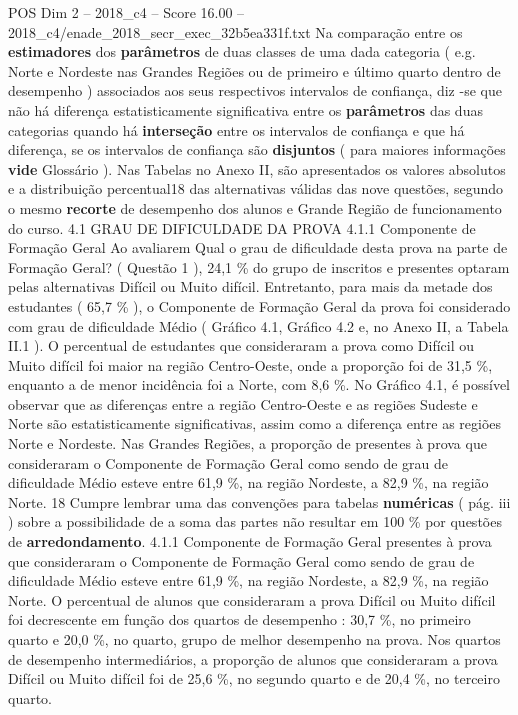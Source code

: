 \begin{textsample}{POS Dim 2 – 2018\_c4 – Score 16.00 – 2018\_c4/enade\_2018\_secr\_exec\_32b5ea331f.txt}
Na comparação entre os \textbf{estimadores} dos \textbf{parâmetros} de duas classes de uma dada categoria ( e.g.
Norte e Nordeste nas Grandes Regiões ou de primeiro e último quarto dentro de desempenho ) associados aos seus respectivos intervalos de confiança, diz -se que não há diferença estatisticamente significativa entre os \textbf{parâmetros} das duas categorias quando há \textbf{interseção} entre os intervalos de confiança e que há diferença, se os intervalos de confiança são \textbf{disjuntos} ( para maiores informações \textbf{vide} Glossário ).
Nas Tabelas no Anexo II, são apresentados os valores absolutos e a distribuição percentual18 das alternativas válidas das nove questões, segundo o mesmo \textbf{recorte} de desempenho dos alunos e Grande Região de funcionamento do curso. 4.1 GRAU DE DIFICULDADE DA PROVA 4.1.1 Componente de Formação Geral Ao avaliarem Qual o grau de dificuldade desta prova na parte de Formação Geral? ( Questão 1 ), 24,1 \% do grupo de inscritos e presentes optaram pelas alternativas Difícil ou Muito difícil.
Entretanto, para mais da metade dos estudantes ( 65,7 \% ), o Componente de Formação Geral da prova foi considerado com grau de dificuldade Médio ( Gráfico 4.1, Gráfico 4.2 e, no Anexo II, a Tabela II.1 ).
O percentual de estudantes que consideraram a prova como Difícil ou Muito difícil foi maior na região Centro-Oeste, onde a proporção foi de 31,5 \%, enquanto a de menor incidência foi a Norte, com 8,6 \%.
No Gráfico 4.1, é possível observar que as diferenças entre a região Centro-Oeste e as regiões Sudeste e Norte são estatisticamente significativas, assim como a diferença entre as regiões Norte e Nordeste.
Nas Grandes Regiões, a proporção de presentes à prova que consideraram o Componente de Formação Geral como sendo de grau de dificuldade Médio esteve entre 61,9 \%, na região Nordeste, a 82,9 \%, na região Norte. 18 Cumpre lembrar uma das convenções para tabelas \textbf{numéricas} ( pág. iii ) sobre a possibilidade de a soma das partes não resultar em 100 \% por questões de \textbf{arredondamento}. 4.1.1 Componente de Formação Geral presentes à prova que consideraram o Componente de Formação Geral como sendo de grau de dificuldade Médio esteve entre 61,9 \%, na região Nordeste, a 82,9 \%, na região Norte.
O percentual de alunos que consideraram a prova Difícil ou Muito difícil foi decrescente em função dos quartos de desempenho : 30,7 \%, no primeiro quarto e 20,0 \%, no quarto, grupo de melhor desempenho na prova.
Nos quartos de desempenho intermediários, a proporção de alunos que consideraram a prova Difícil ou Muito difícil foi de 25,6 \%, no segundo quarto e de 20,4 \%, no terceiro quarto.

\end{textsample}
